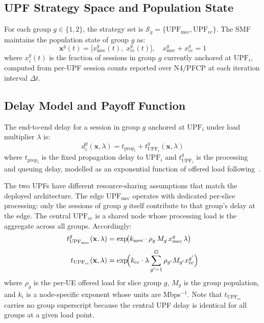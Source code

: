 \documentclass[conference]{IEEEtran}
\begin{document}
\subsection{UPF Strategy Space and Population State}
\label{sec:strategy}

For each group $g \in \{1,2\}$, the strategy set is
$\mathcal{S}_g = \{\text{UPF}_\text{mec},
\text{UPF}_\text{cc}\}$.
The SMF maintains the population state of group $g$ as:
\begin{equation}
    \mathbf{x}^g(t) = \bigl[x_\text{mec}^g(t),\;
    x_\text{cc}^g(t)\bigr], \quad
    x_\text{mec}^g + x_\text{cc}^g = 1
    \label{eq:popstate}
\end{equation}
where $x_i^g(t)$ is the fraction of sessions in group
$g$ currently anchored at $\text{UPF}_i$, computed from
per-UPF session counts reported over N4/PFCP at each
iteration interval $\Delta t$.

\subsection{Delay Model and Payoff Function}
\label{sec:delay}

The end-to-end delay for a session in group $g$ anchored
at $\text{UPF}_i$ under load multiplier $\lambda$ is:
\begin{equation}
    d_i^g(\mathbf{x},\lambda) = t_{\text{prop}_i}
    + t_{\text{UPF}_i}^g(\mathbf{x},\lambda)
    \label{eq:delay}
\end{equation}
where $t_{\text{prop}_i}$ is the fixed propagation delay
to $\text{UPF}_i$ and $t_{\text{UPF}_i}^g$ is the
processing and queuing delay, modelled as an exponential
function of offered load following~\cite{Alevizaki2021upf}.

The two UPFs have different resource-sharing assumptions
that match the deployed architecture. The edge
$\text{UPF}_\text{mec}$ operates with dedicated
per-slice processing: only the sessions of group $g$
itself contribute to that group's delay at the edge.
The central $\text{UPF}_\text{cc}$ is a shared node
whose processing load is the aggregate across all groups.
Accordingly:
\begin{align}
    t_{\text{UPF}_\text{mec}}^g(\mathbf{x},\lambda)
      &= \exp\!\bigl(k_\text{mec}\cdot
         \rho_g\,M_g\,x_\text{mec}^g\,\lambda\bigr)
    \label{eq:upf_delay_mec} \\[4pt]
    t_{\text{UPF}_\text{cc}}(\mathbf{x},\lambda)
      &= \exp\!\Bigl(k_\text{cc}\cdot\lambda
         \sum_{g'=1}^{G}\rho_{g'} M_{g'}
         x_\text{cc}^{g'}\Bigr)
    \label{eq:upf_delay_cc}
\end{align}
where $\rho_g$ is the per-UE offered load for slice group
$g$, $M_g$ is the group population, and $k_i$ is a
node-specific exponent whose units are Mbps$^{-1}$.
Note that $t_{\text{UPF}_\text{cc}}$ carries no group
superscript because the central UPF delay is identical
for all groups at a given load point.
\end{document}
